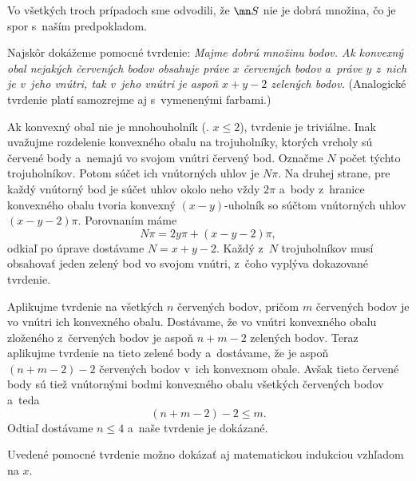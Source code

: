 {Vo všetkých troch prípadoch sme odvodili, že $\mn S$ nie je dobrá množina, čo je spor s~naším predpokladom.


\ineriesenie
Najskôr dokážeme pomocné tvrdenie: {\sl Majme dobrú množinu bodov. Ak konvexný obal nejakých červených bodov obsahuje práve $x$
červených bodov a~práve $y$ z~nich je v~jeho vnútri, tak v~jeho vnútri je aspoň $x+y-2$ zelených bodov.} (Analogické tvrdenie platí samozrejme aj s~vymenenými farbami.)

\dokaz
Ak konvexný obal nie je mnohouholník (\tj. $x\le 2$), tvrdenie je triviálne. Inak uvažujme rozdelenie konvexného obalu na trojuholníky, ktorých vrcholy sú červené body a~nemajú vo svojom vnútri červený bod. Označme $N$ počet týchto trojuholníkov. Potom súčet ich vnútorných uhlov je $N\pi$. Na druhej strane, pre každý vnútorný bod je súčet uhlov okolo neho vždy $2\pi$ a~body z~hranice konvexného obalu tvoria konvexný $(x-y)$-uholník so súčtom vnútorných uhlov $(x-y-2)\pi$. Porovnaním máme
$$
N\pi = 2y\pi + (x-y-2)\pi,
$$
odkiaľ po úprave dostávame $N=x+y-2$. Každý z~$N$ trojuholníkov musí obsahovať jeden zelený bod vo svojom vnútri, z~čoho vyplýva dokazované tvrdenie.

Aplikujme tvrdenie na všetkých $n$ červených bodov, pričom $m$ červených bodov je vo vnútri ich konvexného obalu. Dostávame, že vo vnútri konvexného obalu zloženého z~červených bodov je aspoň  $n+m-2$ zelených bodov. Teraz aplikujme tvrdenie na tieto zelené body a~dostávame, že je aspoň $(n+m-2)-2$ červených bodov v~ich konvexnom obale. Avšak tieto červené body sú tiež vnútornými bodmi konvexného obalu všetkých červených bodov a~teda
$$
	(n+m-2)-2 \le m.
$$
Odtiaľ dostávame $n\le 4$ a~naše tvrdenie je dokázané.

\poznamka
Uvedené pomocné tvrdenie možno dokázať aj matematickou indukciou vzhľadom na $x$.
}

